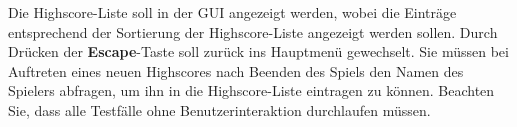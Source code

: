 Die Highscore-Liste soll in der GUI angezeigt werden, wobei die
Eintr\"age entsprechend der Sortierung der Highscore-Liste angezeigt
werden sollen. Durch Drücken der \textbf{Escape}-Taste soll zurück ins Hauptmenü gewechselt.
Sie m\"ussen bei Auftreten eines neuen Highscores
nach Beenden des Spiels den Namen des Spielers abfragen, um ihn in die 
Highscore-Liste eintragen zu k\"onnen.
Beachten Sie, dass alle Testf\"alle ohne Benutzerinteraktion
durchlaufen m\"ussen.
